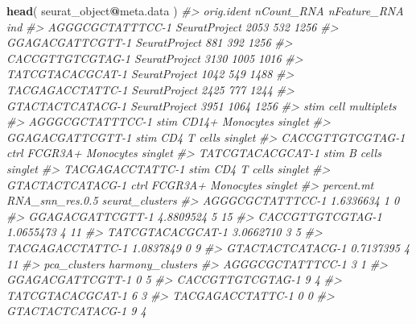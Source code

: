 \documentclass[
]{book}
\newenvironment{Shaded}{\begin{snugshade}}{\end{snugshade}}
\newcommand{\CommentTok}[1]{\textcolor[rgb]{0.56,0.35,0.01}{\textit{#1}}}
\newcommand{\FunctionTok}[1]{\textcolor[rgb]{0.13,0.29,0.53}{\textbf{#1}}}
\newcommand{\NormalTok}[1]{#1}
\newcommand{\SpecialCharTok}[1]{\textcolor[rgb]{0.81,0.36,0.00}{\textbf{#1}}}
\begin{document}
\begin{Shaded}
\begin{Highlighting}[]
\FunctionTok{head}\NormalTok{( seurat\_object}\SpecialCharTok{@}\NormalTok{meta.data )}
\CommentTok{\#\textgreater{}                     orig.ident nCount\_RNA nFeature\_RNA  ind}
\CommentTok{\#\textgreater{} AGGGCGCTATTTCC{-}1 SeuratProject       2053          532 1256}
\CommentTok{\#\textgreater{} GGAGACGATTCGTT{-}1 SeuratProject        881          392 1256}
\CommentTok{\#\textgreater{} CACCGTTGTCGTAG{-}1 SeuratProject       3130         1005 1016}
\CommentTok{\#\textgreater{} TATCGTACACGCAT{-}1 SeuratProject       1042          549 1488}
\CommentTok{\#\textgreater{} TACGAGACCTATTC{-}1 SeuratProject       2425          777 1244}
\CommentTok{\#\textgreater{} GTACTACTCATACG{-}1 SeuratProject       3951         1064 1256}
\CommentTok{\#\textgreater{}                  stim              cell multiplets}
\CommentTok{\#\textgreater{} AGGGCGCTATTTCC{-}1 stim   CD14+ Monocytes    singlet}
\CommentTok{\#\textgreater{} GGAGACGATTCGTT{-}1 stim       CD4 T cells    singlet}
\CommentTok{\#\textgreater{} CACCGTTGTCGTAG{-}1 ctrl FCGR3A+ Monocytes    singlet}
\CommentTok{\#\textgreater{} TATCGTACACGCAT{-}1 stim           B cells    singlet}
\CommentTok{\#\textgreater{} TACGAGACCTATTC{-}1 stim       CD4 T cells    singlet}
\CommentTok{\#\textgreater{} GTACTACTCATACG{-}1 ctrl FCGR3A+ Monocytes    singlet}
\CommentTok{\#\textgreater{}                  percent.mt RNA\_snn\_res.0.5 seurat\_clusters}
\CommentTok{\#\textgreater{} AGGGCGCTATTTCC{-}1  1.6336634               1               0}
\CommentTok{\#\textgreater{} GGAGACGATTCGTT{-}1  4.8809524               5              15}
\CommentTok{\#\textgreater{} CACCGTTGTCGTAG{-}1  1.0655473               4              11}
\CommentTok{\#\textgreater{} TATCGTACACGCAT{-}1  3.0662710               3               5}
\CommentTok{\#\textgreater{} TACGAGACCTATTC{-}1  1.0837849               0               9}
\CommentTok{\#\textgreater{} GTACTACTCATACG{-}1  0.7137395               4              11}
\CommentTok{\#\textgreater{}                  pca\_clusters harmony\_clusters}
\CommentTok{\#\textgreater{} AGGGCGCTATTTCC{-}1            3                1}
\CommentTok{\#\textgreater{} GGAGACGATTCGTT{-}1            0                5}
\CommentTok{\#\textgreater{} CACCGTTGTCGTAG{-}1            9                4}
\CommentTok{\#\textgreater{} TATCGTACACGCAT{-}1            6                3}
\CommentTok{\#\textgreater{} TACGAGACCTATTC{-}1            0                0}
\CommentTok{\#\textgreater{} GTACTACTCATACG{-}1            9                4}

\end{Highlighting}
\end{Shaded}
\end{document}
